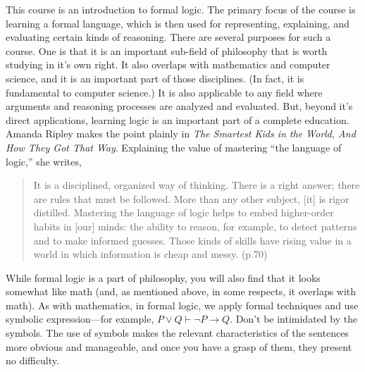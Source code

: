 
This course is an introduction to formal logic. The primary focus of the course is learning a formal language, which is then used for representing, explaining, and evaluating certain kinds of reasoning. There are several purposes for such a course. One is that it is an important sub-field of philosophy that is worth studying in it's own right. It also overlaps with mathematics and computer science, and it is an important part of those disciplines. (In fact, it is fundamental to computer science.) It is also applicable to any field where arguments and reasoning processes are analyzed and evaluated. But, beyond it's direct applications, learning logic is an important part of a complete education. Amanda Ripley makes the point plainly in \textit{The Smartest Kids in the World, And How They Got That Way}. Explaining the value of mastering ``the language of logic,'' she writes,

\begin{quote}
It is a disciplined, organized way of thinking. There is a right answer; there are rules that must be followed. More than any other subject, [it] is rigor distilled. Mastering the language of logic helps to embed higher-order habits in [our] minds: the ability to reason, for example, to detect patterns and to make informed guesses. Those kinds of skills have rising value in a world in which information is cheap and messy. (p.70)
\end{quote}

While formal logic is a part of philosophy, you will also find that it looks somewhat like math (and, as mentioned above, in some respects, it overlaps with math). As with mathematics, in formal logic, we apply formal techniques and use symbolic expression—for example, $P \lor Q \vdash \lnot P \rightarrow Q$. Don’t be intimidated by the symbols. The use of symbols makes the relevant characteristics of the sentences more obvious and manageable, and once you have a grasp of them, they present no difficulty.
